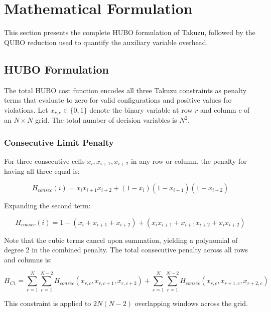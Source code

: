 \documentclass[eng]{ajceam-class}
\begin{document}
\section{Mathematical Formulation}

This section presents the complete HUBO formulation of Takuzu, followed by the QUBO reduction used to quantify the auxiliary variable overhead.

\subsection{HUBO Formulation}

The total HUBO cost function encodes all three Takuzu constraints as penalty terms that evaluate to zero for valid configurations and positive values for violations. Let $x_{r,c} \in \{0, 1\}$ denote the binary variable at row $r$ and column $c$ of an $N \times N$ grid. The total number of decision variables is $N^2$.

\subsubsection{Consecutive Limit Penalty}

For three consecutive cells $x_i, x_{i+1}, x_{i+2}$ in any row or column, the penalty for having all three equal is:

\begin{equation} \label{eq:penalty_consec}
 H_{consec}(i) = x_i x_{i+1} x_{i+2} + (1 - x_i)(1 - x_{i+1})(1 - x_{i+2})
\end{equation}

Expanding the second term:

\begin{equation} \label{eq:penalty_expanded}
 H_{consec}(i) = 1 - (x_i + x_{i+1} + x_{i+2}) + (x_i x_{i+1} + x_{i+1} x_{i+2} + x_i x_{i+2})
\end{equation}

Note that the cubic terms cancel upon summation, yielding a polynomial of degree 2 in the combined penalty. The total consecutive penalty across all rows and columns is:

\begin{equation}
 H_{C1} = \sum_{r=1}^{N} \sum_{c=1}^{N-2} H_{consec}(x_{r,c}, x_{r,c+1}, x_{r,c+2}) + \sum_{c=1}^{N} \sum_{r=1}^{N-2} H_{consec}(x_{r,c}, x_{r+1,c}, x_{r+2,c})
\end{equation}

This constraint is applied to $2N(N-2)$ overlapping windows across the grid.
\end{document}
